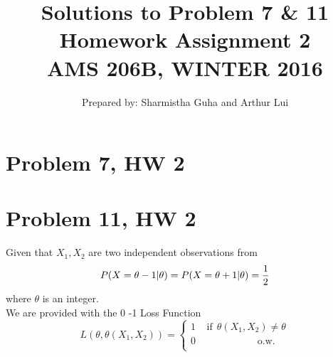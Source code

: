 \documentclass[12pt]{article}
\def\frac#1#2{{{#1}\over{#2}}}
\begin{document}
\title{Solutions to Problem 7 \& 11\\
Homework Assignment 2 \\
{\small {\bf AMS 206B, WINTER 2016 }} \\
}

\author{Prepared by: Sharmistha Guha and Arthur Lui}

\maketitle


\section*{Problem 7, HW 2}


\section*{Problem 11, HW 2}
Given that $X_1, X_2$ are two independent observations from
\begin{equation}
P(X=\theta-1|\theta)=P(X=\theta+1|\theta)=\frac{1}{2}
\end{equation}
where $\theta$ is an integer. \\
We are provided with the 0 -1 Loss Function
$$
L(\theta,\theta(X_1,X_2))=\left\{\begin{array}{c}
1\:\:\:\:\:\mbox{if}\:\:\theta(X_1,X_2)\neq \theta\\
0\:\:\:\:\:\:\:\:\:\:\:\:\:\:\:\:\:\:\:\:\:\:\:\:\:\:\:\:\mbox{o.w.}\\
\end{array}
\right.
$$
\end{document}
